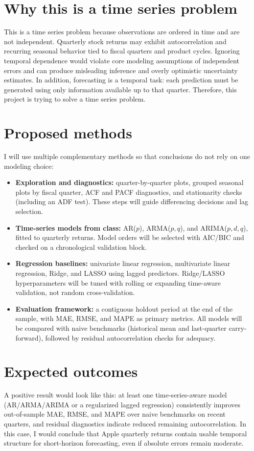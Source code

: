 \documentclass[11pt]{article}
\begin{document}
\section*{Why this is a time series problem}
This is a time series problem because observations are ordered in time and are not independent. Quarterly stock returns may exhibit autocorrelation and recurring seasonal behavior tied to fiscal quarters and product cycles. Ignoring temporal dependence would violate core modeling assumptions of independent errors and can produce misleading inference and overly optimistic uncertainty estimates. In addition, forecasting is a temporal task: each prediction must be generated using only information available up to that quarter. Therefore, this project is trying to solve a time series problem.

\section*{Proposed methods}
I will use multiple complementary methods so that conclusions do not rely on one modeling choice:

\begin{itemize}
	\item \textbf{Exploration and diagnostics:} quarter-by-quarter plots, grouped seasonal plots by fiscal quarter, ACF and PACF diagnostics, and stationarity checks (including an ADF test). These steps will guide differencing decisions and lag selection.
	\item \textbf{Time-series models from class:} AR($p$), ARMA($p,q$), and ARIMA($p,d,q$), fitted to quarterly returns. Model orders will be selected with AIC/BIC and checked on a chronological validation block.
	\item \textbf{Regression baselines:} univariate linear regression, multivariate linear regression, Ridge, and LASSO using lagged predictors. Ridge/LASSO hyperparameters will be tuned with rolling or expanding time-aware validation, not random cross-validation.
	\item \textbf{Evaluation framework:} a contiguous holdout period at the end of the sample, with MAE, RMSE, and MAPE as primary metrics. All models will be compared with naive benchmarks (historical mean and last-quarter carry-forward), followed by residual autocorrelation checks for adequacy.
\end{itemize}

\section*{Expected outcomes}
A positive result would look like this: at least one time-series-aware model (AR/ARMA/ARIMA or a regularized lagged regression) consistently improves out-of-sample MAE, RMSE, and MAPE over naive benchmarks on recent quarters, and residual diagnostics indicate reduced remaining autocorrelation. In this case, I would conclude that Apple quarterly returns contain usable temporal structure for short-horizon forecasting, even if absolute errors remain moderate.
\end{document}
